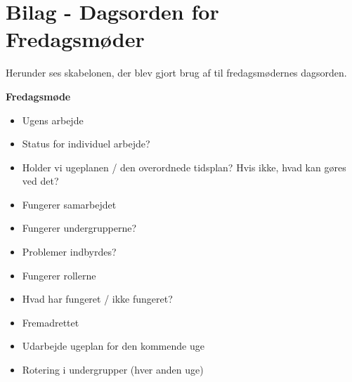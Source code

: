 \chapter{Bilag - Dagsorden for Fredagsmøder} \label{Bilag4}
Herunder ses skabelonen, der blev gjort brug af til fredagsmødernes dagsorden. \\
\newline
\newline
\begin{huge}
\textbf{Fredagsmøde}
\end{huge}
\begin{itemize}
\item Ugens arbejde 
\item Status for individuel arbejde?
\item Holder vi ugeplanen / den overordnede tidsplan? Hvis ikke, hvad kan gøres ved det?
\item Fungerer samarbejdet
\item Fungerer undergrupperne?
\item Problemer indbyrdes?
\item Fungerer rollerne
\item Hvad har fungeret / ikke fungeret?
\item Fremadrettet
\item Udarbejde ugeplan for den kommende uge 
\item Rotering i undergrupper (hver anden uge)
\end{itemize}
